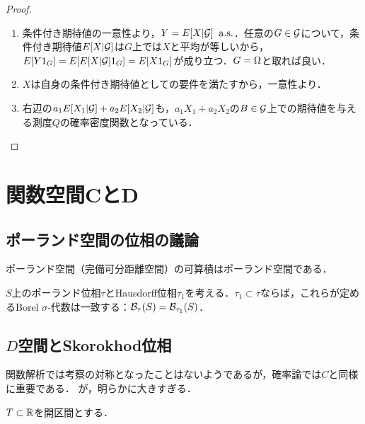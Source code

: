 \documentclass[uplatex,dvipdfmx]{jsreport}
\begin{document}
\begin{proof}\mbox{}
    \begin{enumerate}
        \item 条件付き期待値の一意性より，$Y=E[X|\mathcal{G}]\;\;\mathrm{a.s.}$．任意の$G\in\mathcal{G}$について，条件付き期待値$E[X|\mathcal{G}]$は$G$上では$X$と平均が等しいから，
        $E[Y1_G]=E[E[X|\mathcal{G}]1_G]=E[X1_G]$が成り立つ．$G=\Omega$と取れば良い．
        \item $X$は自身の条件付き期待値としての要件を満たすから，一意性より．
        \item 右辺の$a_1E[X_1|\mathcal{G}]+a_2E[X_2|\mathcal{G}]$も，$a_1X_1+a_2X_2$の$B\in\mathcal{G}$上での期待値を与える測度$Q$の確率密度関数となっている．
    \end{enumerate}
\end{proof}

\section{関数空間CとD}

\subsection{ポーランド空間の位相の議論}

\begin{lemma}
    ポーランド空間（完備可分距離空間）の可算積はポーランド空間である．
\end{lemma}

\begin{theorem}
    $S$上のポーランド位相$\tau$とHausdorff位相$\tau_1$を考える．$\tau_1\subset\tau$ならば，これらが定めるBorel $\sigma$-代数は一致する：$\mathcal{B}_\tau(S)=\mathcal{B}_{\tau_1}(S)$．
\end{theorem}

\subsection{$D$空間とSkorokhod位相}

\begin{tcolorbox}[colframe=ForestGreen, colback=ForestGreen!10!white,breakable,colbacktitle=ForestGreen!40!white,coltitle=black,fonttitle=\bfseries\sffamily,
title=]
    関数解析では考察の対称となったことはないようであるが，確率論では$C$と同様に重要である．
    が，明らかに大きすぎる．
\end{tcolorbox}

\begin{notation}
    $T\subset\mathbb{R}$を開区間とする．
\end{notation}
\end{document}

